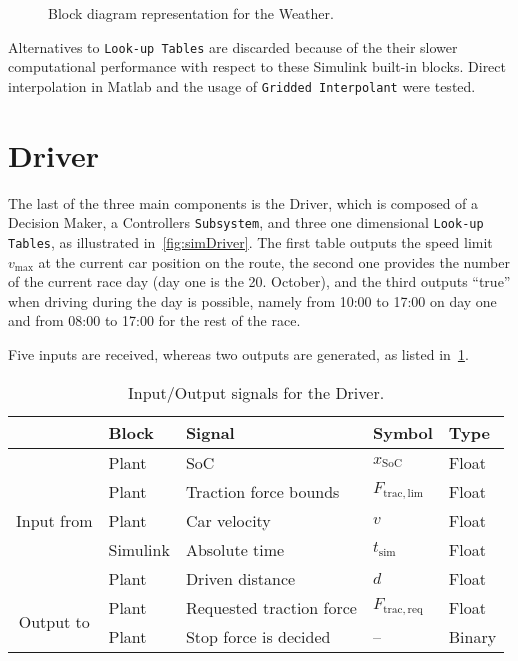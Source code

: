 \begin{figure}[htbp]
	\centering
	
	\caption{Block diagram representation for the Weather.}
	\label{fig:simWeather}
\end{figure}

Alternatives to \texttt{Look-up Tables} are discarded because of the their slower computational performance with respect to these Simulink built-in blocks. Direct interpolation in Matlab and the usage of \texttt{Gridded Interpolant} were tested.

\newpage
\section{Driver}
\label{sec:simDriver}
The last of the three main components is the Driver, which is composed of a Decision Maker, a Controllers \texttt{Subsystem}, and three one dimensional \texttt{Look-up Tables}, as illustrated in~\cref{fig:simDriver}. The first table outputs the speed limit $v_\mathrm{max}$ at the current car position on the route, the second one provides the number of the current race day (day one is the 20. October), and the third outputs \enquote{true} when driving during the day is possible, namely from 10:00 to 17:00 on day one and from 08:00 to 17:00 for the rest of the race.
\begin{sidewaysfigure}[htbp]
	\centering
	
	\caption{Block diagram representation of the Driver.}
	\label{fig:simDriver}
\end{sidewaysfigure}

Five inputs are received, whereas two outputs are generated, as listed in~\cref{tab:simInOutDriver}.
\begin{table}[htbp]
	\centering
	\caption{Input/Output signals for the Driver.}
	\label{tab:simInOutDriver}
	
	\begin{tabular}{c l l l l}
		\toprule
		& Block & Signal & Symbol & Type \\ 
		\midrule
		\multirow{5}{*}{Input from}
		& Plant & SoC & $x_\mathrm{SoC}$ & Float \\
		& Plant & Traction force bounds & $F_\mathrm{trac,lim}$ & Float \\
		& Plant & Car velocity & $v$ & Float \\
		& Simulink & Absolute time & $t_\mathrm{sim}$ & Float \\
		& Plant & Driven distance & $d$ & Float \\
		\midrule
		\multirow{2}{*}{Output to}
		& Plant & Requested traction force & $F_\mathrm{trac,req}$ & Float \\
		& Plant & Stop force is decided & -- & Binary \\
		\bottomrule
	\end{tabular}
\end{table}


